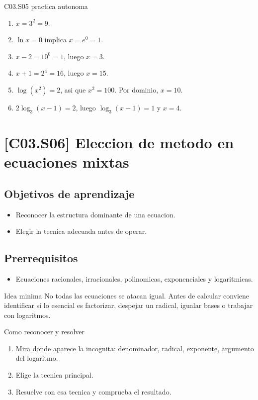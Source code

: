 \begin{fullsolution}{C03.S05 practica autonoma}
\begin{enumerate}[label=\textbf{PX-C03.S05-\arabic*:}, leftmargin=*]
  \item \(x=3^2=9\).
  \item \(\ln x=0\) implica \(x=e^0=1\).
  \item \(x-2=10^0=1\), luego \(x=3\).
  \item \(x+1=2^4=16\), luego \(x=15\).
  \item \(\log(x^2)=2\), asi que \(x^2=100\). Por dominio, \(x=10\).
  \item \(2\log_3(x-1)=2\), luego \(\log_3(x-1)=1\) y \(x=4\).
\end{enumerate}
\end{fullsolution}

\section{[C03.S06] Eleccion de metodo en ecuaciones mixtas}

\subsection*{Objetivos de aprendizaje}
\begin{itemize}
  \item Reconocer la estructura dominante de una ecuacion.
  \item Elegir la tecnica adecuada antes de operar.
\end{itemize}

\subsection*{Prerrequisitos}
\begin{itemize}
  \item Ecuaciones racionales, irracionales, polinomicas, exponenciales y logaritmicas.
\end{itemize}

\begin{theorybox}{Idea minima}
No todas las ecuaciones se atacan igual. Antes de calcular conviene identificar si lo esencial
es factorizar, despejar un radical, igualar bases o trabajar con logaritmos.
\end{theorybox}

\begin{methodbox}{Como reconocer y resolver}
\begin{enumerate}
  \item Mira donde aparece la incognita: denominador, radical, exponente, argumento del logaritmo.
  \item Elige la tecnica principal.
  \item Resuelve con esa tecnica y comprueba el resultado.
\end{enumerate}
\end{methodbox}


